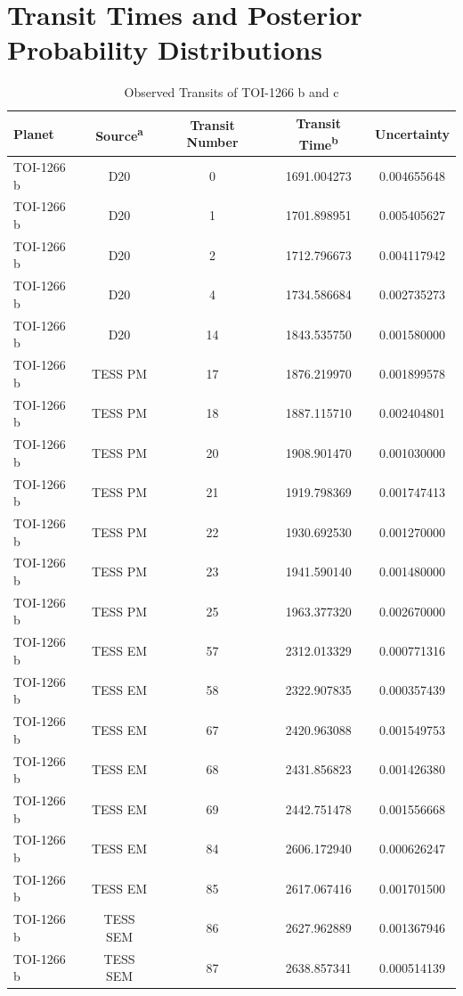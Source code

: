 \documentclass[twocolumn]{aastex631}
\begin{document}
\appendix

\section{Transit Times and Posterior Probability Distributions} \label{appendix}

\begin{table}[htbp]
\centering
\caption{Observed Transits of TOI-1266 b and c}
\small
\begin{tabular}{lcccc}
\hline
Planet & Source\textsuperscript{a} & Transit Number & Transit Time\textsuperscript{b} & Uncertainty \\
\hline
TOI-1266 b & D20 & 0 & 1691.004273 & 0.004655648 \\
TOI-1266 b & D20 & 1 & 1701.898951 & 0.005405627 \\
TOI-1266 b & D20 & 2 & 1712.796673 & 0.004117942 \\
TOI-1266 b & D20 & 4 & 1734.586684 & 0.002735273 \\
TOI-1266 b & D20 & 14 & 1843.535750 & 0.001580000 \\
TOI-1266 b & TESS PM & 17 & 1876.219970 & 0.001899578 \\
TOI-1266 b & TESS PM & 18 & 1887.115710 & 0.002404801 \\
TOI-1266 b & TESS PM & 20 & 1908.901470 & 0.001030000 \\
TOI-1266 b & TESS PM & 21 & 1919.798369 & 0.001747413 \\
TOI-1266 b & TESS PM & 22 & 1930.692530 & 0.001270000 \\
TOI-1266 b & TESS PM & 23 & 1941.590140 & 0.001480000 \\
TOI-1266 b & TESS PM & 25 & 1963.377320 & 0.002670000 \\
TOI-1266 b & TESS EM & 57 & 2312.013329 & 0.000771316 \\
TOI-1266 b & TESS EM & 58 & 2322.907835 & 0.000357439 \\
TOI-1266 b & TESS EM & 67 & 2420.963088 & 0.001549753 \\
TOI-1266 b & TESS EM & 68 & 2431.856823 & 0.001426380 \\
TOI-1266 b & TESS EM & 69 & 2442.751478 & 0.001556668 \\
TOI-1266 b & TESS EM & 84 & 2606.172940 & 0.000626247 \\
TOI-1266 b & TESS EM & 85 & 2617.067416 & 0.001701500 \\
TOI-1266 b & TESS SEM & 86 & 2627.962889 & 0.001367946 \\
TOI-1266 b & TESS SEM & 87 & 2638.857341 & 0.000514139 \\

\end{tabular}
\end{table}
\end{document}
